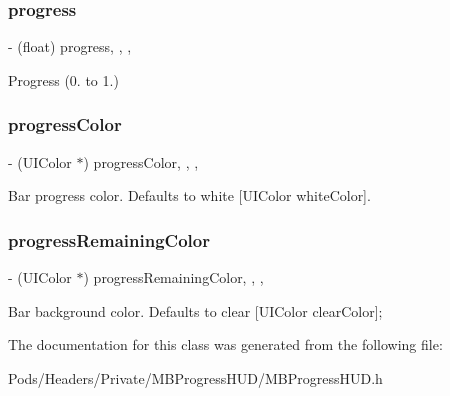 \subsubsection{\texorpdfstring{progress}{progress}}
{\footnotesize\ttfamily -\/ (float) progress\hspace{0.3cm}{\ttfamily [read]}, {\ttfamily [write]}, {\ttfamily [nonatomic]}, {\ttfamily [assign]}}

Progress (0. to 1.) \mbox{\label{interface_m_b_bar_progress_view_a4d81d1482e7071cb2d18105eb45f5463}} 
\subsubsection{\texorpdfstring{progress\+Color}{progressColor}}
{\footnotesize\ttfamily -\/ (U\+I\+Color $\ast$) progress\+Color\hspace{0.3cm}{\ttfamily [read]}, {\ttfamily [write]}, {\ttfamily [nonatomic]}, {\ttfamily [assign]}}

Bar progress color. Defaults to white \mbox{[}U\+I\+Color white\+Color\mbox{]}. \mbox{\label{interface_m_b_bar_progress_view_a5f6841a883120376724ae875e09790c3}} 
\subsubsection{\texorpdfstring{progress\+Remaining\+Color}{progressRemainingColor}}
{\footnotesize\ttfamily -\/ (U\+I\+Color $\ast$) progress\+Remaining\+Color\hspace{0.3cm}{\ttfamily [read]}, {\ttfamily [write]}, {\ttfamily [nonatomic]}, {\ttfamily [assign]}}

Bar background color. Defaults to clear \mbox{[}U\+I\+Color clear\+Color\mbox{]}; 

The documentation for this class was generated from the following file\+:\begin{DoxyCompactItemize}
\item 
Pods/\+Headers/\+Private/\+M\+B\+Progress\+H\+U\+D/M\+B\+Progress\+H\+U\+D.\+h\end{DoxyCompactItemize}
